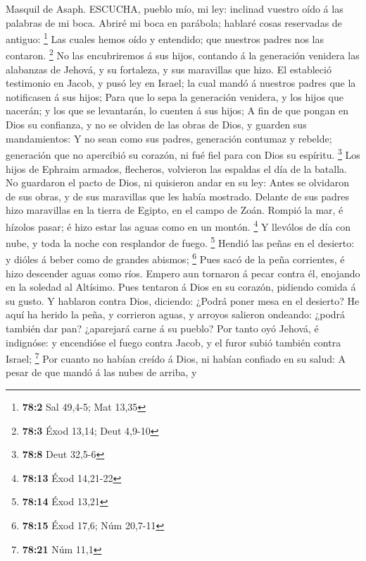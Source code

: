  Masquil de Asaph. ESCUCHA, pueblo mío, mi ley: inclinad
vuestro oído á las palabras de mi boca.  Abriré mi boca en
parábola; hablaré cosas reservadas de antiguo: \footnote{\textbf{78:2}
  Sal 49,4-5; Mat 13,35}  Las cuales hemos oído y entendido;
que nuestros padres nos las contaron. \footnote{\textbf{78:3} Éxod
  13,14; Deut 4,9-10}  No las encubriremos á sus hijos,
contando á la generación venidera las alabanzas de Jehová, y su
fortaleza, y sus maravillas que hizo.  El estableció
testimonio en Jacob, y pusó ley en Israel; la cual mandó á nuestros
padres que la notificasen á sus hijos;  Para que lo sepa la
generación venidera, y los hijos que nacerán; y los que se levantarán,
lo cuenten á sus hijos;  A fin de que pongan en Dios su
confianza, y no se olviden de las obras de Dios, y guarden sus
mandamientos:  Y no sean como sus padres, generación
contumaz y rebelde; generación que no apercibió su corazón, ni fué fiel
para con Dios su espíritu. \footnote{\textbf{78:8} Deut 32,5-6}
 Los hijos de Ephraim armados, flecheros, volvieron las
espaldas el día de la batalla.  No guardaron el pacto de
Dios, ni quisieron andar en su ley:  Antes se olvidaron de
sus obras, y de sus maravillas que les había mostrado. 
Delante de sus padres hizo maravillas en la tierra de Egipto, en el
campo de Zoán.  Rompió la mar, é hízolos pasar; é hizo
estar las aguas como en un montón. \footnote{\textbf{78:13} Éxod
  14,21-22}  Y llevólos de día con nube, y toda la noche
con resplandor de fuego. \footnote{\textbf{78:14} Éxod 13,21}
 Hendió las peñas en el desierto: y dióles á beber como de
grandes abismos; \footnote{\textbf{78:15} Éxod 17,6; Núm 20,7-11}
 Pues sacó de la peña corrientes, é hizo descender aguas
como ríos.  Empero aun tornaron á pecar contra él, enojando
en la soledad al Altísimo.  Pues tentaron á Dios en su
corazón, pidiendo comida á su gusto.  Y hablaron contra
Dios, diciendo: ¿Podrá poner mesa en el desierto?  He aquí
ha herido la peña, y corrieron aguas, y arroyos salieron ondeando:
¿podrá también dar pan? ¿aparejará carne á su pueblo?  Por
tanto oyó Jehová, é indignóse: y encendióse el fuego contra Jacob, y el
furor subió también contra Israel; \footnote{\textbf{78:21} Núm 11,1}
 Por cuanto no habían creído á Dios, ni habían confiado en
su salud:  A pesar de que mandó á las nubes de arriba, y
